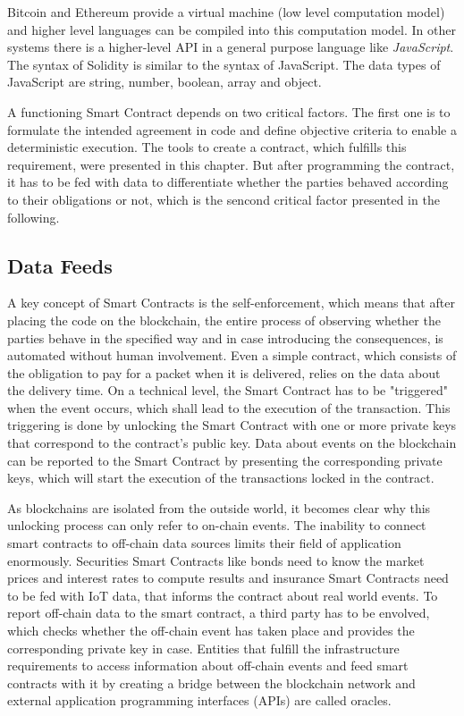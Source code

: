 \documentclass[conference]{IEEEtran}
\begin{document}
Bitcoin and Ethereum provide a virtual machine (low level computation model) and higher level languages can be compiled into this computation model. In other systems there is a higher-level API in a general purpose language like \textit{JavaScript}. The syntax of Solidity is similar to the syntax of JavaScript. \cite{McAdams2017} The data types of JavaScript are string, number, boolean, array and object. \cite{McPeak2015} \par 
A functioning Smart Contract depends on two critical factors. The first one is to formulate the intended agreement in code and define objective criteria to enable a deterministic execution. The tools to create a contract, which fulfills this requirement, were presented in this chapter. But after programming the contract, it has to be fed with data to differentiate whether the parties behaved according to their obligations or not, which is the sencond critical factor presented in the following. 
\subsection{Data Feeds}
A key concept of Smart Contracts is the self-enforcement, which means that after placing the code on the blockchain, the entire process of observing whether the parties behave in the specified way and in case introducing the consequences, is automated without human involvement. Even a simple contract, which consists of the obligation to pay for a packet when it is delivered, relies on the data about the delivery time. On a technical level, the Smart Contract has to be "triggered" when the event occurs, which shall lead to the execution of the transaction. This triggering is done by unlocking the Smart Contract with one or more private keys that correspond to the contract's public key. Data about events on the blockchain can be reported to the Smart Contract by presenting the corresponding private keys, which will start the execution of the transactions locked in the contract. \cite{Mik2017} \par
As blockchains are isolated from the outside world, it becomes clear why this unlocking process can only refer to on-chain events. The inability to connect smart contracts to off-chain data sources limits their field of application enormously. Securities Smart Contracts like bonds need to know the market prices and interest rates to compute results and insurance Smart Contracts need to be fed with IoT data, that informs the contract about real world events. To report off-chain data to the smart contract, a third party has to be envolved, which checks whether the off-chain event has taken place and provides the corresponding private key in case. Entities that fulfill the infrastructure requirements to access information about off-chain events and feed smart contracts with it by creating a bridge between the blockchain network and external application programming interfaces (APIs) are called oracles. \cite{Mik2017} \cite{Ellis2017} \cite{Thomas2014} \par  
 
\end{document}
